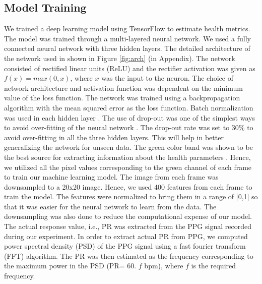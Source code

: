  \subsection{Model Training}
%

%
We trained a deep learning model using TensorFlow to estimate health metrics. The model was trained through a multi-layered neural network.   We used a fully connected neural network with three hidden layers. The detailed architecture of the network used in shown in Figure \ref{fig:arch} (in Appendix). The network consisted of rectified linear units (ReLU) and the rectifier activation was given  as $f(x)=max(0,x)$, where $x$ was the input to the neuron. The choice of network architecture and activation function was dependent on the minimum value of the loss function. The network was trained using a backpropagation algorithm with the mean squared error as the loss function.  Batch normalization was used in each hidden layer \cite{DBLP:journals/corr/IoffeS15}. The use of drop-out was one of the simplest ways to avoid over-fitting of the neural network \cite{srivastava2014dropout}. The drop-out rate was set to 30\% to avoid over-fitting in all the three hidden layers. This will help in better generalizing the network for unseen data. The green color band was shown to be the best source for extracting information about the health parameters \cite{verkruysse2008remote}. Hence, we utilized all the pixel values corresponding to the green channel of each frame to train our machine learning model. The image from each frame was downsampled to a 20x20 image. Hence, we used 400 features from each frame to train the model. The features were normalized to bring them in a range of [0,1] so that it was easier for the neural network to learn from the data. The downsampling was also done to reduce the computational expense of our model. The actual response value, i.e., PR was extracted from the PPG signal recorded during our experiment. In order to extract actual PR from PPG, we computed power spectral density (PSD) of the PPG signal using a fast fourier transform (FFT) algorithm. The PR was then estimated as the frequency corresponding to the maximum power in the PSD (PR= 60. $\mathit{f}$ bpm), where $\mathit{f}$ is the required frequency.





%




%
%
%
    